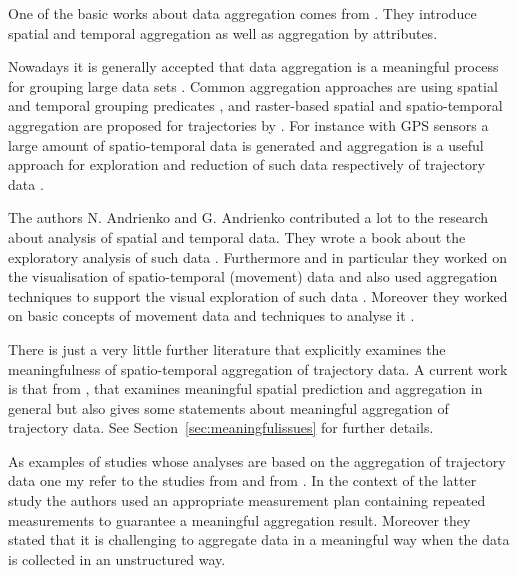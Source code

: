 \documentclass[12pt, oneside, a4paper]{scrbook}
\begin{document}
One of the basic works about data aggregation comes from \citet{fredrikson_temporal_1999}. They introduce spatial and temporal aggregation as well as aggregation by attributes.
\par\medskip

Nowadays it is generally accepted that data aggregation is a meaningful process for grouping large data sets \citep{goldstein_using_1994}. 
Common aggregation approaches are using spatial and temporal grouping predicates \citep{fredrikson_temporal_1999}, and raster-based spatial and spatio-temporal aggregation are proposed for trajectories by \citet{meratnia_aggregation_2002}.
For instance with GPS sensors a large amount of spatio-temporal data is generated and aggregation is a useful approach for exploration and reduction of such data respectively of trajectory data \citep{andrienko_exploratory_2003, giannotti_trajectory_2007, andrienko_spatial_2011}.
\par\medskip

The authors N. Andrienko and G. Andrienko contributed a lot to the research about analysis of spatial and temporal data. They wrote a book about the exploratory analysis of such data \citep{andrienko2006exploratory}. 
Furthermore and in particular they worked on the visualisation of spatio-temporal (movement) data \citep{andrienko_exploratory_2003, andrienko2012visual} and also used aggregation techniques to support the visual exploration of such data \citep{andrienko2008spatio, andrienko2010general, andrienko_spatial_2011}. Moreover they worked on basic concepts of movement data and techniques to analyse it \citep{andrienko2008basic, andrienko2011conceptual}.
\par\medskip

There is just a very little further literature that explicitly examines the meaningfulness of spatio-temporal aggregation of trajectory data. A current work is that from \citet{stasch_meaningful_2014}, that examines meaningful spatial prediction and aggregation in general but also gives some statements about meaningful aggregation of trajectory data. See Section~\ref{sec:meaningfulissues} for further details.
\par\medskip

As examples of studies whose analyses are based on the aggregation of trajectory data one my refer to the studies from \citet{d2013participatory} and from \citet{elen2012aeroflex}. In the context of the latter study the authors used an appropriate measurement plan containing repeated measurements to guarantee a meaningful aggregation result. Moreover they stated that it is challenging to aggregate data in a meaningful way when the data is collected in an unstructured way.
\end{document}
